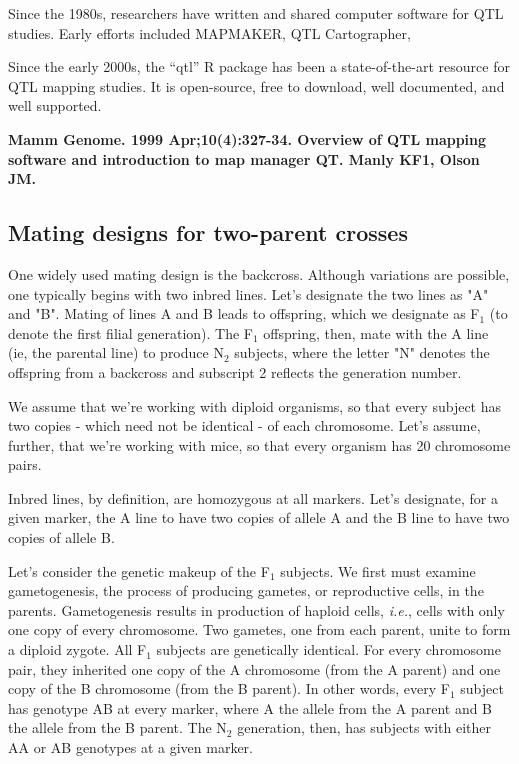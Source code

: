 \documentclass[]{article}
\begin{document}
Since the 1980s, researchers have written and shared computer software
for QTL studies. Early efforts included MAPMAKER, QTL Cartographer,

Since the early 2000s, the ``qtl'' R package has been a
state-of-the-art resource for QTL mapping studies. It is open-source,
free to download, well documented, and well supported.

\textbf{Mamm Genome. 1999 Apr;10(4):327-34. Overview of QTL mapping
software and introduction to map manager QT. Manly KF1, Olson JM.}


\subsection{Mating designs for two-parent crosses}


One widely used mating design is the backcross. Although variations are possible, one typically begins with two inbred lines. Let's designate the two lines as "A" and "B". Mating of lines A and B leads to offspring, which we designate as F$_1$ (to denote the first filial generation). The F$_1$ offspring, then, mate with the A line (ie, the parental line) to produce N$_2$ subjects, where the letter "N" denotes the offspring from a backcross and subscript 2 reflects the generation number.

We assume that we're working with diploid organisms, so that every subject has two copies - which need not be identical - of each chromosome. Let's assume, further, that we're working with mice, so that every organism has 20 chromosome pairs. 

Inbred lines, by definition, are homozygous at all markers. Let's designate, for a given marker, the A line to have two copies of allele A and the B line to have two copies of allele B. 

Let's consider the genetic makeup of the F$_1$ subjects. We first must examine gametogenesis, the process of producing gametes, or reproductive cells, in the parents. Gametogenesis results in production of haploid cells, \emph{i.e.}, cells with only one copy of every chromosome. Two gametes, one from each parent, unite to form a diploid zygote. All F$_1$ subjects are genetically identical. For every chromosome pair, they inherited one copy of the A chromosome (from the A parent) and one copy of the B chromosome (from the B parent). In other words, every F$_1$ subject has genotype AB at every marker, where A the allele from the A parent and B the allele from the B parent. The N$_2$ generation, then, has subjects with either AA or AB genotypes at a given marker. 
\end{document}
